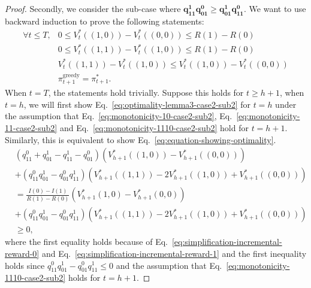 \begin{proof}
Secondly, we consider the sub-case where $\boxed{\bm{q^1_{11}q^0_{01}\geq q^1_{01}q^0_{11}}}$. We want to use backward induction to prove the following statements:
\begin{align}
    \forall t\leq T, &0\leq V_t^*\left((1,0)\right)-V_t^*((0,0))\leq{R(1)-R(0)}\label{eq:monotonicity-10-case2-sub2}\\
    &0\leq V_t^*\left((1,1)\right)-V_t^*((1,0))\leq R(1)-R(0)\label{eq:monotonicity-11-case2-sub2}\\
    &V_t^*\left((1,1)\right)-V_t^*((1,0))\leq V_t^*\left((1,0)\right)-V_t^*((0,0))\label{eq:monotonicity-1110-case2-sub2}\\
    &\pi_{t+1}^{\text{greedy}}=\pi_{t+1}^*.\label{eq:optimality-lemma3-case2-sub2}
\end{align}
When $t=T$, the statements hold trivially. Suppose this holds for $t\geq h+1$, when $t=h$, we will first show Eq.~\eqref{eq:optimality-lemma3-case2-sub2} for $t=h$ under the assumption that Eq.~\eqref{eq:monotonicity-10-case2-sub2}, Eq.~\eqref{eq:monotonicity-11-case2-sub2} and Eq.~\eqref{eq:monotonicity-1110-case2-sub2} hold for $t=h+1$. Similarly, this is equivalent to show Eq.~\eqref{eq:equation-showing-optimality}.
\begin{align*}
    &\left(q^0_{11}+q^1_{01}-q^1_{11}-q^0_{01}\right)\left(V_{h+1}^*\left((1,0)\right)-V_{h+1}^*\left((0,0)\right)\right)\\&+\left(q^0_{11}q^1_{01}-q^0_{01}q^1_{11}\right)\left(V_{h+1}^*\left((1,1)\right)-2V_{h+1}^*\left((1,0)\right)+V_{h+1}^*\left((0,0)\right)\right)\\
    &=\frac{I(0)-I(1)}{R(1)-R(0)}\left(V_{h+1}^*(1,0)-V_{h+1}^*(0,0)\right)\\
    &+\left(q^0_{11}q^1_{01}-q^0_{01}q^1_{11}\right)\left(V_{h+1}^*\left((1,1)\right)-2V_{h+1}^*\left((1,0)\right)+V_{h+1}^*\left((0,0)\right)\right)\\
    &\geq 0,
\end{align*}
where the first equality holds because of Eq.~\eqref{eq:simplification-incremental-reward-0} and Eq.~\eqref{eq:simplification-incremental-reward-1} and the first inequality holds since $q^0_{11}q^1_{01}-q^0_{01}q^1_{11}\leq 0$ and the assumption that Eq.~\eqref{eq:monotonicity-1110-case2-sub2} holds for $t=h+1$.


\end{proof}
